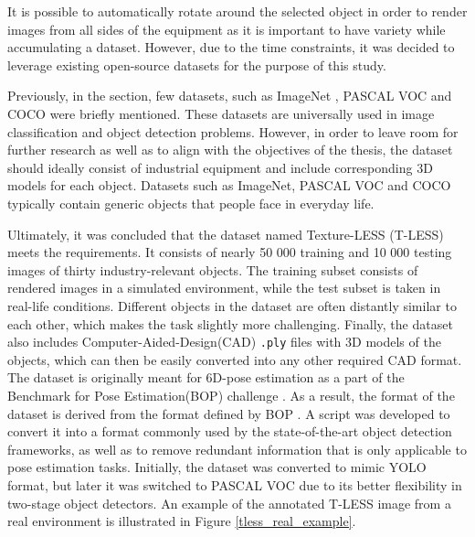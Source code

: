 It is possible to automatically rotate around the selected object in order to render images from all sides of the equipment as it is important to have variety while accumulating a dataset. However, due to the time constraints, it was decided to leverage existing open-source datasets for the purpose of this study. 

Previously, in the  section, few datasets, such as ImageNet \cite{Russakovsky2014}, PASCAL VOC \cite{Everingham10} and COCO \cite{Lin2014} were briefly mentioned. These datasets are universally used in image classification and object detection problems. However, in order to leave room for further research as well as to align with the objectives of the thesis, the dataset should ideally consist of industrial equipment and include corresponding 3D models for each object. Datasets such as ImageNet, PASCAL VOC and COCO typically contain generic objects that people face in everyday life. 

Ultimately, it was concluded that the dataset named Texture-LESS (T-LESS)  \cite{hodan2017tless} meets the requirements. It consists of nearly 50 000 training and 10 000 testing images of thirty industry-relevant objects. The training subset consists of rendered images in a simulated environment, while the test subset is taken in real-life conditions.  Different objects in the dataset are often distantly similar to each other, which makes the task slightly more challenging. Finally, the dataset also includes Computer-Aided-Design(CAD) \texttt{.ply} files with 3D models of the objects, which can then be easily converted into any other required CAD format. The dataset is originally meant for 6D-pose estimation \cite{hodan2017tless} as a part of the Benchmark for Pose Estimation(BOP) challenge \cite{hodan2018bop}. As a result, the format of the dataset is derived from the format defined by BOP \cite{hodan2018bop_format}. A script was developed to convert it into a format commonly used by the state-of-the-art object detection frameworks, as well as to remove redundant information that is only applicable to pose estimation tasks. Initially, the dataset was converted to mimic YOLO \cite{Redmon2015a} format, but later it was switched to PASCAL VOC due to its better flexibility in two-stage object detectors. An example of the annotated T-LESS image from a real environment is illustrated in Figure \ref{tless_real_example}. 

